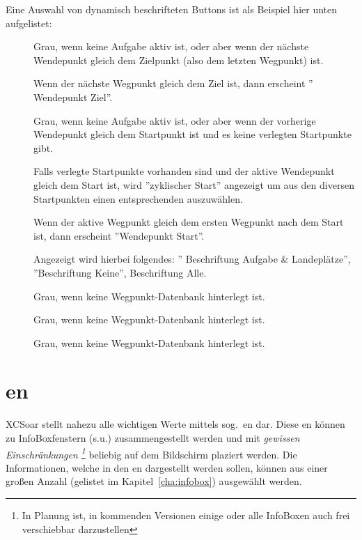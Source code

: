 Eine Auswahl von dynamisch beschrifteten Buttons ist als Beispiel hier unten aufgelistet:

\begin{description}
\item[]
  Grau, wenn keine  Aufgabe aktiv ist, oder aber wenn der nächste Wendepunkt gleich dem Zielpunkt (also dem letzten Wegpunkt) ist.

 Wenn der nächste Wegpunkt gleich dem Ziel ist, dann erscheint '' Wendepunkt Ziel''.
\item[]
  Grau, wenn keine  Aufgabe aktiv ist, oder aber wenn der vorherige Wendepunkt gleich dem Startpunkt ist und es keine verlegten Startpunkte gibt.

  Falls verlegte Startpunkte vorhanden sind und der aktive Wendepunkt gleich dem Start ist, wird ''zyklischer Start'' angezeigt um aus den diversen Startpunkten einen entsprechenden auszuwählen.

Wenn der aktive Wegpunkt gleich dem ersten Wegpunkt nach dem Start ist, dann erscheint  ''Wendepunkt Start''.
\item[]
Angezeigt wird hierbei folgendes: '' Beschriftung Aufgabe \& Landeplätze'', ''Beschriftung Keine'', Beschriftung Alle.

\item[]
 Grau,  wenn keine Wegpunkt-Datenbank hinterlegt ist.
 \item[]
  Grau,  wenn keine Wegpunkt-Datenbank hinterlegt ist.
\item[]
  Grau,  wenn keine Wegpunkt-Datenbank hinterlegt ist.
\end{description}

\section{{\InfoBox}en}

\textsf{XCSoar} stellt nahezu alle wichtigen Werte mittels  sog.\  {\InfoBox}en dar. 
Diese {\InfoBox}en können zu InfoBoxfenstern (s.u.) zusammengestellt werden und mit
\emph{gewissen Einschränkungen \footnote{In Planung ist, in kommenden Versionen einige oder alle 
InfoBoxen auch frei verschiebbar darzustellen}} beliebig auf dem Bildschirm plaziert werden. 
Die Informationen, welche in den  {\InfoBox}en dargestellt werden sollen,  können aus einer großen Anzahl (gelistet im Kapitel~\ref{cha:infobox}) ausgewählt werden.

